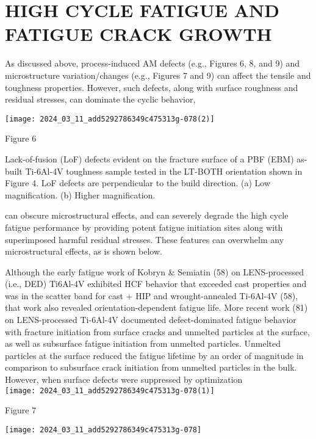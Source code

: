 \documentclass[10pt]{article}
\begin{document}
\section*{HIGH CYCLE FATIGUE AND FATIGUE CRACK GROWTH}
As discussed above, process-induced AM defects (e.g., Figures 6, 8, and 9) and microstructure variation/changes (e.g., Figures 7 and 9) can affect the tensile and toughness properties. However, such defects, along with surface roughness and residual stresses, can dominate the cyclic behavior,

\begin{center}
\texttt{[image: 2024\_03\_11\_add5292786349c475313g-078(2)]}
\end{center}

Figure 6

Lack-of-fusion (LoF) defects evident on the fracture surface of a PBF (EBM) as-built Ti-6Al-4V toughness sample tested in the LT-BOTH orientation shown in Figure 4. LoF defects are perpendicular to the build direction. (a) Low magnification. (b) Higher magnification.

can obscure microstructural effects, and can severely degrade the high cycle fatigue performance by providing potent fatigue initiation sites along with superimposed harmful residual stresses. These features can overwhelm any microstructural effects, as is shown below.

Although the early fatigue work of Kobryn \& Semiatin (58) on LENS-processed (i.e., DED) Ti6Al-4V exhibited HCF behavior that exceeded cast properties and was in the scatter band for cast + HIP and wrought-annealed Ti-6Al-4V (58), that work also revealed orientation-dependent fatigue life. More recent work (81) on LENS-processed Ti-6Al-4V documented defect-dominated fatigue behavior with fracture initiation from surface cracks and unmelted particles at the surface, as well as subsurface fatigue initiation from unmelted particles. Unmelted particles at the surface reduced the fatigue lifetime by an order of magnitude in comparison to subsurface crack initiation from unmelted particles in the bulk. However, when surface defects were suppressed by optimization\\
\texttt{[image: 2024\_03\_11\_add5292786349c475313g-078(1)]}

Figure 7

\begin{center}
\texttt{[image: 2024\_03\_11\_add5292786349c475313g-078]}
\end{center}
\end{document}
